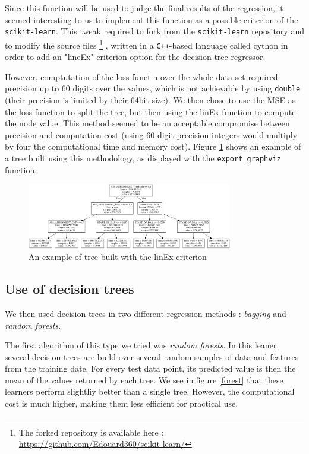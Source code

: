 \documentclass[a4paper,10pt]{article}
\begin{document}
  Since this function will be used to judge the final results of the regression, it seemed interesting to us to implement this function as a possible criterion of the {\tt scikit-learn}. This tweak required to fork from the {\tt scikit-learn} repository and to modify the source files
    \footnote{\label{note_git}The forked repository is available here : \url{https://github.com/Edouard360/scikit-learn/}}
  , written in a {\tt C++}-based language called cython in order to add an "lineEx" criterion option for the decision tree regressor.


  However, comptutation of the loss functin over the whole data set required precision up to 60 digits over the values, which is not achievable by using {\tt double} (their precision is limited by their 64bit size). We then chose to use the MSE as the loss function to split the tree, but then using the linEx function to compute the node value. This method seemed to be an acceptable compromise between precision and computation cost (using 60-digit precision integers would multiply by four the computational time and memory cost). Figure \ref{tree_example} shows an example of a tree built using this methodology, as displayed with the {\tt export\_graphviz} function.
  \begin{figure}
    \centering
    \includegraphics[width=0.8\textwidth]{graphics/tree.png}
    \caption{An example of tree built with the linEx criterion}
      \label{tree_example}
  \end{figure}

  \subsection{Use of decision trees}

  We then used decision trees in two different regression methods : \emph{bagging} and \emph{random forests}.

  The first algorithm of this type we tried was \emph{random forests}. In this leaner, several decision trees are build over several random samples of data and features from the training date. For every test data point, its predicted value is then the mean of the values returned by each tree. We see in figure \ref{forest} that these learners perform slightliy better than a single tree. However, the computational cost is much higher, making them less efficient for practical use.
\end{document}
